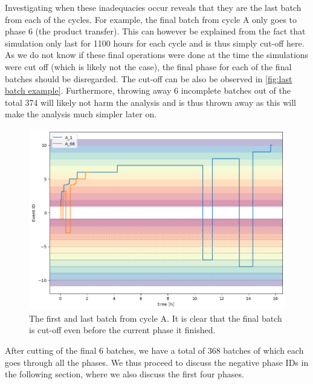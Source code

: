 \documentclass[../Thesis.tex]{subfiles}
\begin{document}
Investigating when these inadequacies occur reveals that they are the last batch from each of the cycles. For example, the final batch from cycle A only goes to phase 6 (the product transfer). This can however be explained from the fact that simulation only last for 1100 hours for each cycle and is thus simply cut-off here. As we do not know if these final operations were done at the time the simulations were cut off (which is likely not the case), the final phase for each of the final batches should be disregarded. The cut-off can be also be observed in \autoref{fig:last batch example}. Furthermore, throwing away 6 incomplete batches out of the total 374 will likely not harm the analysis and is thus thrown away as this will make the analysis much simpler later on.

\begin{figure}[h]
    \centering
    \includegraphics[width=0.8\linewidth]{figures/Multiple cycles data/tailing batch short.png}
    \caption{The first and last batch from cycle A. It is clear that the final batch is cut-off even before the current phase it finished.}
    \label{fig:last batch example}
\end{figure}

After cutting of the final 6 batches, we have a total of 368 batches of which each goes through all the phases. We thus proceed to discuss the negative phase IDs in the following section, where we also discuss the first four phases.


\end{document}
